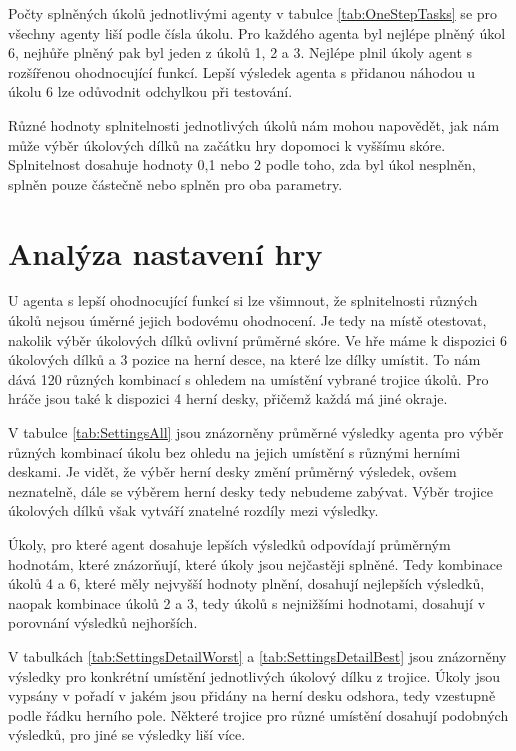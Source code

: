 \tableOneStepAgentsDetailButtonsCats

Počty splněných úkolů jednotlivými agenty v tabulce \ref{tab:OneStepTasks} se pro všechny agenty liší podle čísla úkolu. Pro každého agenta byl nejlépe plněný úkol 6, nejhůře plněný pak byl jeden z úkolů 1, 2 a 3. Nejlépe plnil úkoly agent s rozšířenou ohodnocující funkcí. Lepší výsledek agenta s přidanou náhodou u úkolu 6 lze odůvodnit odchylkou při testování.

\tableOneStepAgentsDetailTasks

Různé hodnoty splnitelnosti jednotlivých úkolů nám mohou napovědět, jak nám může výběr úkolových dílků na začátku hry dopomoci k vyššímu skóre. Splnitelnost dosahuje hodnoty 0,1 nebo 2 podle toho, zda byl úkol nesplněn, splněn pouze částečně nebo splněn pro oba parametry.


\section{Analýza nastavení hry}

U agenta s lepší ohodnocující funkcí si lze všimnout, že splnitelnosti různých úkolů nejsou úměrné jejich bodovému ohodnocení. Je tedy na místě otestovat, nakolik výběr úkolových dílků ovlivní průměrné skóre. Ve hře máme k dispozici 6 úkolových dílků a 3 pozice na herní desce, na které lze dílky umístit. To nám dává 120 různých kombinací s ohledem na umístění vybrané trojice úkolů. Pro hráče jsou také k dispozici 4 herní desky, přičemž každá má jiné okraje. 


V tabulce \ref{tab:SettingsAll} jsou znázorněny průměrné výsledky agenta pro výběr různých kombinací úkolu bez ohledu na jejich umístění s různými herními deskami. Je vidět, že výběr herní desky změní průměrný výsledek, ovšem neznatelně, dále se výběrem herní desky tedy nebudeme zabývat. Výběr trojice úkolových dílků však vytváří znatelné rozdíly mezi výsledky. 

Úkoly, pro které agent dosahuje lepších výsledků odpovídají průměrným hodnotám, které znázorňují, které úkoly jsou nejčastěji splněné. Tedy kombinace úkolů 4 a 6, které měly nejvyšší hodnoty plnění, dosahují nejlepších výsledků, naopak kombinace úkolů 2 a 3, tedy úkolů s nejnižšími hodnotami, dosahují v porovnání výsledků nejhorších.

\tableSettings

V tabulkách \ref{tab:SettingsDetailWorst} a \ref{tab:SettingsDetailBest} jsou znázorněny výsledky pro konkrétní umístění jednotlivých úkolový dílku z trojice. Úkoly jsou vypsány v pořadí v jakém jsou přidány na herní desku odshora, tedy vzestupně podle řádku herního pole. Některé trojice pro různé umístění dosahují podobných výsledků, pro jiné se výsledky liší více. 


